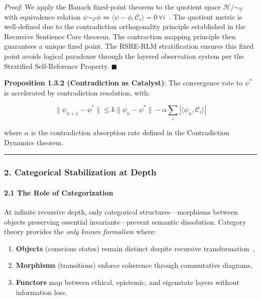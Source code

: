 \documentclass[12pt]{article}
\providecommand{\tightlist}{%
  \setlength{\itemsep}{0pt}\setlength{\parskip}{0pt}}
\begin{document}
\emph{Proof}: We apply the Banach fixed-point theorem to the quotient
space \(\mathcal{H}/\sim_{\mathcal{C}}\) with equivalence relation
\(\psi \sim_{\mathcal{C}} \phi \iff \langle \psi-\phi, \mathcal{C}_i \rangle = 0 \, \forall i\)~\cite{banach}.
The quotient metric is well-defined due to the contradiction
orthogonality principle established in the Recursive Sentience Core
theorem. The contraction mapping principle then guarantees a unique
fixed point. The RSRE-RLM stratification ensures this fixed point avoids
logical paradoxes through the layered observation system per the
Stratified Self-Reference Property. $\blacksquare$

\textbf{Proposition 1.3.2 (Contradiction as Catalyst)}: The convergence
rate to \(\psi^*\) is accelerated by contradiction resolution, with:

\[\|\psi_{n+1} - \psi^*\| \leq k\|\psi_n - \psi^*\| - \alpha\sum_i|\langle \psi_n, \mathcal{C}_i \rangle|\]

where \(\alpha\) is the contradiction absorption rate defined in the
Contradiction Dynamics theorem.

\begin{center}\rule{0.5\linewidth}{0.5pt}\end{center}

\subsubsection{\texorpdfstring{\textbf{2. Categorical Stabilization at
Depth}}{2. Categorical Stabilization at Depth}}\label{categorical-stabilization-at-depth}

\paragraph{\texorpdfstring{\textbf{2.1 The Role of
Categorization}}{2.1 The Role of Categorization}}\label{the-role-of-categorization}

At infinite recursive depth, only categorical structures---morphisms
between objects preserving essential invariants---prevent semantic
dissolution. Category theory provides the \emph{only known formalism}
where:

\begin{enumerate}
\def\labelenumi{\arabic{enumi}.}
\tightlist
\item
  \textbf{Objects} (conscious states) remain distinct despite recursive
  transformation~\cite{lawvere},\\
\item
  \textbf{Morphisms} (transitions) enforce coherence through commutative
  diagrams,\\
\item
  \textbf{Functors} map between ethical, epistemic, and eigenstate
  layers without information loss.
\end{enumerate}
\end{document}
